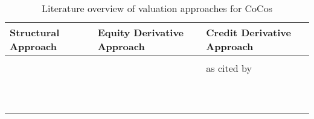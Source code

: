 \begin{table}[H]
	\tiny
	\setlength{\extrarowheight}{2.5pt}
	\centering
	\begin{tabular}{>{\centering\arraybackslash}p{4cm}>{\centering\arraybackslash}p{4cm}>{\centering\arraybackslash}p{4cm}}
		\toprule
			Structural Approach & Equity Derivative Approach & Credit Derivative Approach \\
		\midrule
			\citet{pennacchi2010structural} & \citet{de2011pricing} &  \citet{de2011pricing}\\
			\citet{albul2010contingent}  & \citet{henriques2011making} &  \citet{serjantov2011hybrid} as cited by \citet{wilkens2014contingent}\\
			\citet{madan2011conic}  & \citet{alvemar2012modelling} &  \citet{alvemar2012modelling}\\
			\citet{glasserman2012contingent} & \citet{teneberg2012equity} & \citet{erismann2015pricing}   \\
			\citet{alvemar2012modelling}  & \citet{corcuera2014close} &  \\
			\citet{buergi2013pricing} & \citet{erismann2015pricing}  &  \\
			\citet{hilscher2014bank}  &  &  \\
			\citet{pennacchi2015reexamination} & & \\
			\citet{turfus2015cocos} & & \\
			\citet{cheridito2015pricing} & & \\
			\citet{erismann2015pricing} & & \\
			\citet{sundaresan2015design} & & \\
		\bottomrule
	\end{tabular}
	\caption[Literature overview of valuation approaches for CoCos] {Literature overview of valuation approaches for CoCos \citep{wilkens2014contingent, erismann2015pricing}}
	\label{tbl:paper}
\end{table}


